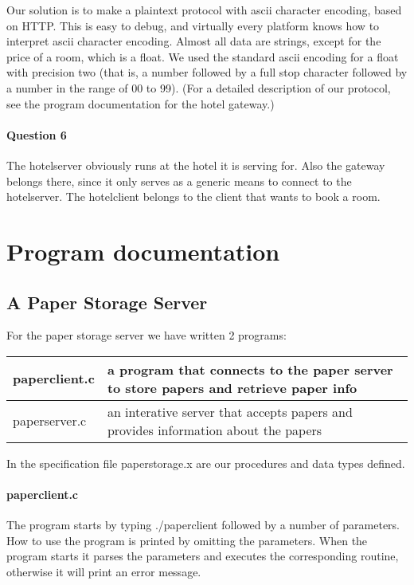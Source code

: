 \documentclass[a4paper,10pt]{article}
\begin{document}
Our solution is to make a plaintext protocol with ascii character encoding, based on HTTP. This is easy to debug, and virtually every platform knows how to interpret ascii character encoding. Almost all data are strings, except for the price of a room, which is a float. We used the standard ascii encoding for a float with precision two (that is, a number followed by a full stop character followed by a number in the range of 00 to 99). (For a detailed description of our protocol, see the program documentation for the hotel gateway.)

\paragraph{Question 6}
The hotelserver obviously runs at the hotel it is serving for. Also the gateway belongs there, since it only serves as a generic means to connect to the hotelserver. The hotelclient belongs to the client that wants to book a room.

\section{Program documentation}
\subsection{A Paper Storage Server}
For the paper storage server we have written 2 programs:
\begin{center}
\begin{tabular}{ l | p{9cm} }
paperclient.c & a program that connects to the paper server to store papers and retrieve paper info\\ \hline
paperserver.c & an interative server that accepts papers and provides information about the papers\\
\end{tabular}
\end{center}

In the specification file paperstorage.x are our procedures and data types defined.

\paragraph{paperclient.c}
The program starts by typing ./paperclient followed by a number of parameters. How to use the program is printed by omitting the parameters. When the program starts it parses the parameters and executes the corresponding routine, otherwise it will print an error message.
\end{document}
